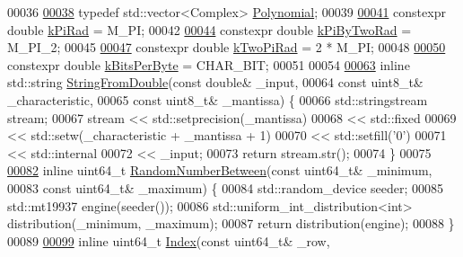 \begin{DoxyCode}
00036 
\hyperlink{util_8h_a975407298bb80f7f2272702fa7bfe14d}{00038} \textcolor{keyword}{typedef} std::vector<Complex> \hyperlink{util_8h_a975407298bb80f7f2272702fa7bfe14d}{Polynomial};
00039 
\hyperlink{util_8h_aafd53d7ece71a9ace600ad244ddb72ac}{00041} constexpr \textcolor{keywordtype}{double} \hyperlink{util_8h_aafd53d7ece71a9ace600ad244ddb72ac}{kPiRad} = M\_PI;
00042 
\hyperlink{util_8h_ab41b2319cbabaf576c9ba15dcba9c0aa}{00044} constexpr \textcolor{keywordtype}{double} \hyperlink{util_8h_ab41b2319cbabaf576c9ba15dcba9c0aa}{kPiByTwoRad} = M\_PI\_2;
00045 
\hyperlink{util_8h_a3a79aec93e2780fa996a064802dc9c5d}{00047} constexpr \textcolor{keywordtype}{double} \hyperlink{util_8h_a3a79aec93e2780fa996a064802dc9c5d}{kTwoPiRad} = 2 * M\_PI;
00048 
\hyperlink{util_8h_ad1122acb7e2ee33cb490199c5992f3ff}{00050} constexpr \textcolor{keywordtype}{double} \hyperlink{util_8h_ad1122acb7e2ee33cb490199c5992f3ff}{kBitsPerByte} = CHAR\_BIT;
00051 
00054 
\hyperlink{util_8h_a87b98378be06910f70a7d2467f45df07}{00063} \textcolor{keyword}{inline} std::string \hyperlink{util_8h_a87b98378be06910f70a7d2467f45df07}{StringFromDouble}(\textcolor{keyword}{const} \textcolor{keywordtype}{double}& \_input,
00064                                     \textcolor{keyword}{const} uint8\_t& \_characteristic,
00065                                     \textcolor{keyword}{const} uint8\_t& \_mantissa) \{
00066   std::stringstream stream;
00067   stream << std::setprecision(\_mantissa)
00068          << std::fixed
00069          << std::setw(\_characteristic + \_mantissa + 1)
00070          << std::setfill(\textcolor{charliteral}{'0'})
00071          << std::internal
00072          << \_input;
00073   \textcolor{keywordflow}{return} stream.str();
00074 \}
00075 
\hyperlink{util_8h_ad1a5ca6ae403ff11e3e628b74727d36a}{00082} \textcolor{keyword}{inline} uint64\_t \hyperlink{util_8h_ad1a5ca6ae403ff11e3e628b74727d36a}{RandomNumberBetween}(\textcolor{keyword}{const} uint64\_t& \_minimum,
00083                                     \textcolor{keyword}{const} uint64\_t& \_maximum) \{
00084   std::random\_device seeder;
00085   std::mt19937 engine(seeder());
00086   std::uniform\_int\_distribution<int> distribution(\_minimum, \_maximum);
00087   \textcolor{keywordflow}{return} distribution(engine);
00088 \}
00089 
\hyperlink{util_8h_a06000e3e4538d7949b83b78663da9554}{00099} \textcolor{keyword}{inline} uint64\_t \hyperlink{util_8h_a06000e3e4538d7949b83b78663da9554}{Index}(\textcolor{keyword}{const} uint64\_t& \_row,

\end{DoxyCode}
